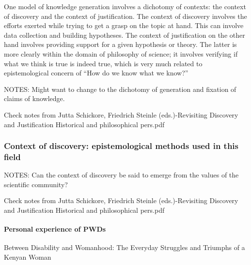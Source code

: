 \documentclass{lps}
\begin{document}
 One model of knowledge generation involves a dichotomy of contexts: the context of discovery and the context of justification. The context of discovery involves the efforts exerted while trying to get a grasp on the topic at hand. This can involve data collection and building hypotheses. The context of justification on the other hand involves providing support for a given hypothesis or theory. The latter is more clearly within the domain of philosophy of science; it involves verifying if what we think is true is indeed true, which is very much related to epistemological concern of “How do we know what we know?” 


NOTES:
Might want to change to the dichotomy of generation and fixation of claims of knowledge.

Check notes from Jutta Schickore, Friedrich Steinle (eds.)-Revisiting Discovery and Justification Historical and philosophical pers.pdf
\subsubsection{Context of discovery: epistemological methods used in this field}
NOTES:
Can the context of discovery be said to emerge from the values of the scientific community?

Check notes from Jutta Schickore, Friedrich Steinle (eds.)-Revisiting Discovery and Justification Historical and philosophical pers.pdf


\paragraph{Personal experience of PWDs}
Between Disability and Womanhood: The Everyday Struggles and Triumphs of a Kenyan Woman
\end{document}
